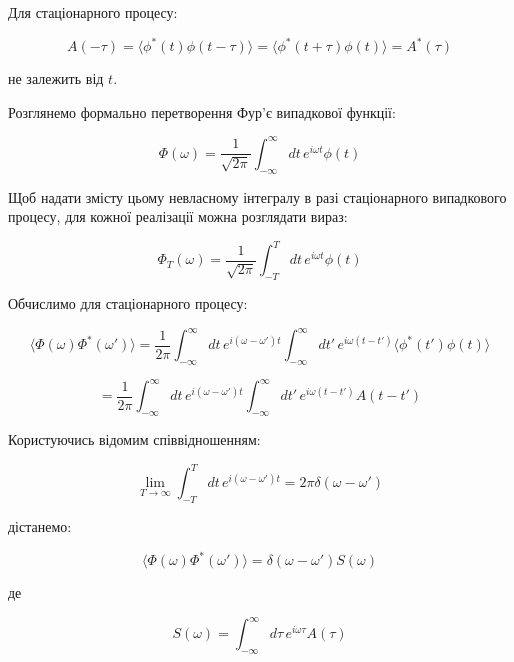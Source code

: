 Для стаціонарного процесу:

\begin{equation*}
A(-\tau) = \langle \phi^{*}(t) \phi(t - \tau) \rangle = \langle \phi^{*}(t + \tau) \phi(t) \rangle = A^{*}(\tau)
\end{equation*}

не залежить від \(t\).

Розглянемо формально перетворення Фур'є випадкової функції:

\begin{equation*}
\Phi(\omega) = \frac{1}{\sqrt{2\pi}} \int_{-\infty}^{\infty} dt \, e^{i\omega t} \phi(t)
\end{equation*}

Щоб надати змісту цьому невласному інтегралу в разі стаціонарного випадкового процесу, для кожної реалізації можна розглядати вираз:

\begin{equation*}
\Phi_T(\omega) = \frac{1}{\sqrt{2\pi}} \int_{-T}^{T} dt \, e^{i\omega t} \phi(t)
\end{equation*}

Обчислимо для стаціонарного процесу:

\begin{equation*}
\langle \Phi(\omega) \Phi^{*}(\omega') \rangle = \frac{1}{2\pi} \int_{-\infty}^{\infty} dt \, e^{i(\omega - \omega')t} \int_{-\infty}^{\infty} dt' \,
e^{i\omega(t - t')} \langle \phi^{*}(t') \phi(t) \rangle
\end{equation*}

\begin{equation*}
= \frac{1}{2\pi} \int_{-\infty}^{\infty} dt \, e^{i(\omega - \omega')t} \int_{-\infty}^{\infty} dt' \, e^{i\omega(t - t')} A(t - t')
\end{equation*}

Користуючись відомим співвідношенням:

\begin{equation*}
\lim_{T \to \infty} \int_{-T}^{T} dt \, e^{i(\omega - \omega')t} = 2\pi \delta(\omega - \omega')
\end{equation*}

дістанемо:

\begin{equation}
\langle \Phi(\omega) \Phi^{*}(\omega') \rangle = \delta(\omega - \omega') S(\omega)
\label{eq:spectral_density}
\end{equation}

де

\begin{equation*}
S(\omega) = \int_{-\infty}^{\infty} d\tau \, e^{i\omega \tau} A(\tau)
\end{equation*}

